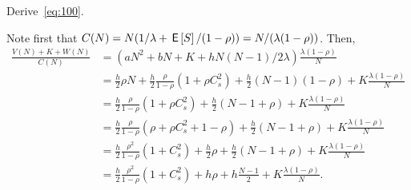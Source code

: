 \documentclass[stochastic-or.tex]{subfiles}
\begin{document}



\begin{extra}\label{ex:n-mg3}
Derive~\cref{eq:100}.
\begin{solution}
  Note first that $C(N) = N(1/\lambda + \,\mathsf{E}\left[S\right] / (1-\rho)) = N/(\lambda(1-\rho))$. Then,
  \begin{align*}
    \frac{V(N) + K + W(N)}{C(N)}
    &= \left(aN^2 + bN + K + h N(N-1)/2 \lambda\right) \frac{\lambda(1-\rho)}N \\
    &= \frac h 2 \rho N  + \frac h 2 \frac \rho{1-\rho} (1+\rho C_s^2) + \frac h 2 (N-1)(1-\rho) + K \frac{\lambda(1-\rho)}N \\
    &= \frac h 2 \frac \rho{1-\rho} (1+\rho C_s^2) + \frac h 2 (N-1 + \rho) + K \frac{\lambda(1-\rho)}N \\
    &= \frac h 2 \frac \rho{1-\rho} (\rho + \rho C_s^2 + 1 - \rho) + \frac h 2 (N-1 + \rho) + K \frac{\lambda(1-\rho)}N \\
    &= \frac h 2 \frac{\rho^2}{1-\rho} (1+ C_s^2) +\frac h 2 \rho + \frac h 2 (N-1 + \rho) + K \frac{\lambda(1-\rho)}N \\
    &= \frac h 2 \frac{\rho^2}{1-\rho} (1+ C_s^2) + h \rho + h \frac{N-1}2 + K \frac{\lambda(1-\rho)}N.
  \end{align*}
\end{solution}
\end{extra}
\end{document}
